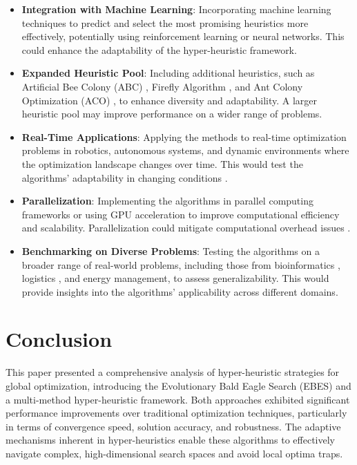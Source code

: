 \documentclass[conference]
{IEEEtran}
\begin{document}
\begin{itemize}
    \item \textbf{Integration with Machine Learning}: Incorporating machine learning techniques to predict and select the most promising heuristics more effectively, potentially using reinforcement learning or neural networks. This could enhance the adaptability of the hyper-heuristic framework.
    \item \textbf{Expanded Heuristic Pool}: Including additional heuristics, such as Artificial Bee Colony (ABC) \cite{karaboga2007powerful}, Firefly Algorithm \cite{yang2010firefly}, and Ant Colony Optimization (ACO) \cite{dorigo2004ant}, to enhance diversity and adaptability. A larger heuristic pool may improve performance on a wider range of problems.
    \item \textbf{Real-Time Applications}: Applying the methods to real-time optimization problems in robotics, autonomous systems, and dynamic environments where the optimization landscape changes over time. This would test the algorithms' adaptability in changing conditions \cite{stulp2012reinforcement}.
    \item \textbf{Parallelization}: Implementing the algorithms in parallel computing frameworks or using GPU acceleration to improve computational efficiency and scalability. Parallelization could mitigate computational overhead issues \cite{pavone2011distributed}.
    \item \textbf{Benchmarking on Diverse Problems}: Testing the algorithms on a broader range of real-world problems, including those from bioinformatics \cite{blum2011swarm}, logistics , and energy management, to assess generalizability. This would provide insights into the algorithms' applicability across different domains.
\end{itemize}

\section{Conclusion}

This paper presented a comprehensive analysis of hyper-heuristic strategies for global optimization, introducing the Evolutionary Bald Eagle Search (EBES) and a multi-method hyper-heuristic framework. Both approaches exhibited significant performance improvements over traditional optimization techniques, particularly in terms of convergence speed, solution accuracy, and robustness. The adaptive mechanisms inherent in hyper-heuristics enable these algorithms to effectively navigate complex, high-dimensional search spaces and avoid local optima traps.
\end{document}
